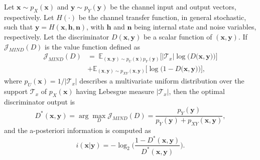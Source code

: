 \begin{lemma}
\label{lemma:MIND_Lemma1}
Let $\mathbf{x}\sim p_X(\mathbf{x})$ and $\mathbf{y}\sim p_Y(\mathbf{y})$ be the channel input and output vectors, respectively. Let $H(\cdot)$ be the channel transfer function, in general stochastic, such that $\mathbf{y} = H(\mathbf{x}, \mathbf{h}, \mathbf{n} )$, with $\mathbf{h}$ and $\mathbf{n}$ being internal state and noise variables, respectively. 
Let the discriminator $D(\mathbf{x},\mathbf{y})$ be a scalar function of $(\mathbf{x},\mathbf{y})$.
If $\mathcal{J}_{MIND}(D)$ is the value function defined as
\begin{align}
\label{eq:MIND_discriminator_function}
\mathcal{J}_{MIND}(D) &= \; \mathbb{E}_{(\mathbf{x},\mathbf{y}) \sim p_{U}(\mathbf{x})p_{Y}(\mathbf{y})}\biggl[|\mathcal{T}_x|\log \biggl(D\bigl(\mathbf{x},\mathbf{y}\bigr)\biggr)\biggr] \nonumber \\ 
& + \mathbb{E}_{(\mathbf{x},\mathbf{y}) \sim p_{XY}(\mathbf{x},\mathbf{y})}\biggl[\log \biggl(1-D\bigl(\mathbf{x},\mathbf{y}\bigr)\biggr)\biggr],
\end{align}
where $p_U(\mathbf{x})=1/|\mathcal{T}_x|$ describes a multivariate uniform distribution over the support $\mathcal{T}_x$ of $p_X(\mathbf{x})$ having Lebesgue measure $|\mathcal{T}_x|$, then the optimal discriminator output is
\begin{equation}
\label{eq:MIND_optimal_discriminator_1}
D^*(\mathbf{x},\mathbf{y}) = \arg \max_D \mathcal{J}_{MIND}(D) = \frac{p_{Y}(\mathbf{y})}{p_{Y}(\mathbf{y}) + p_{XY}(\mathbf{x},\mathbf{y})},
\end{equation}
and the a-posteriori information is computed as
\begin{equation}
\label{eq:MIND_i-DMIE}
i(\mathbf{x}|\mathbf{y}) = -\log_2 \biggl(\frac{1-D^*(\mathbf{x},\mathbf{y})}{D^*(\mathbf{x},\mathbf{y})}\biggr).
\end{equation}
\end{lemma}

